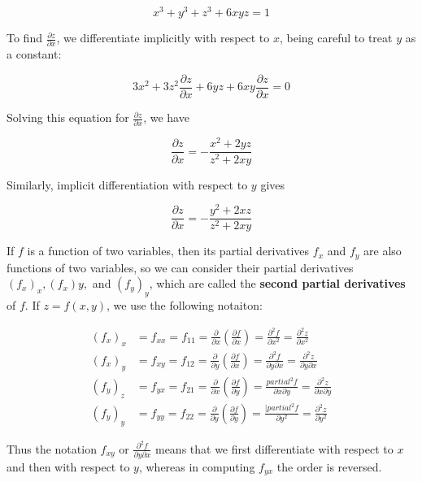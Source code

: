         \[
            x^3 + y^3 + z^3 + 6xyz = 1
        \]

        To find $\frac{\partial z}{\partial x}$, we differentiate implicitly with respect to $x$, being careful to treat $y$ as a constant:

        \[
            3x^2 + 3z^2 \frac{\partial z}{\partial x} + 6yz + 6xy \frac{\partial z}{\partial x} = 0
        \]

        Solving this equation for $\frac{\partial z}{\partial x}$, we have

        \[
            \frac{\partial z}{\partial x} = -\frac{x^2 + 2yz}{z^2 + 2xy}
        \]

        Similarly, implicit differentiation with respect to $y$ gives

        \[
            \frac{\partial z}{\partial x} = -\frac{y^2 + 2xz}{z^2 + 2xy}
        \]

        If $f$ is a function of two variables, then its partial derivatives $f_x$ and $f_y$ are also functions of two variables, so we can consider their partial derivatives $(f_x)_x, (f_x)y,$ and $(f_y)_y$, which are
        called the \textbf{second partial derivatives} of $f$. If $z=f(x,y)$, we use the following notaiton:

        \begin{align*}
            (f_x)_x &= f_{xx} = f_{11} = \frac{\partial}{\partial x} \left(\frac{\partial f}{\partial x}\right) = \frac{\partial^2 f}{\partial x^2} = \frac{\partial^2 z}{\partial x^2} \\
            (f_x)_y &= f_{xy} = f_{12} = \frac{\partial}{\partial y}\left(\frac{\partial f}{\partial x}\right) = \frac{\partial^2 f}{\partial y \partial x} = \frac{\partial^2 z}{\partial y \partial x} \\
            (f_y)_z &= f_{yx} = f_{21} = \frac{\partial}{\partial x}\left(\frac{\partial f}{\partial y}\right) = \frac{partial^2 f}{\partial x \partial y} = \frac{\partial^2 z}{\partial x \partial y} \\
            (f_y)_y &= f_{yy} = f_{22} = \frac{\partial}{\partial y}\left(\frac{\partial f}{\partial y}\right) = \frac{|partial^2 f}{\partial y^2} = \frac{\partial^2 z}{\partial y^2}
        \end{align*}

        Thus the notation $f_{xy}$ or $\frac{\partial^2 f}{\partial y \partial x}$ means that we first differentiate with respect to $x$ and then with respect to $y$, whereas in computing $f_{yx}$ the order is reversed.

